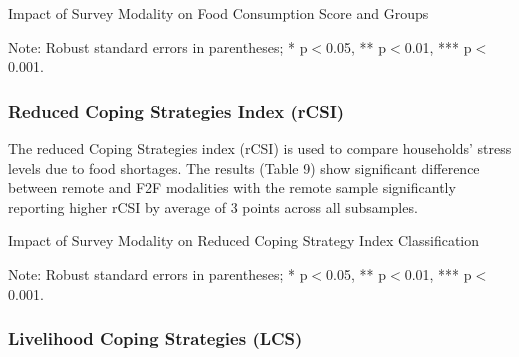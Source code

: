 \documentclass[11pt,harvard]{article}
\begin{document}
	\begin{table}[htbp]
		\centering
		\begin{adjustbox}{max width=\textwidth}
			\begin{threeparttable}
				\caption{Impact of Survey Modality on Food Consumption Score and Groups}
				\scriptsize
				 
				\label{tab:FCS_Modality_CAR}
				\begin{tablenotes}
					\item Note: Robust standard errors in parentheses; * p$<$0.05, ** p$<$0.01, *** p$<$0.001.
				\end{tablenotes}
			\end{threeparttable}
		\end{adjustbox}
	\end{table}
	
\pagebreak	
	
	
\subsubsection{Reduced Coping Strategies Index (rCSI)}

The reduced Coping Strategies index (rCSI) is used to compare households’ stress levels due to food shortages. The results (Table 9) show significant difference between remote and F2F modalities with the remote sample significantly reporting higher rCSI by average of 3 points across all subsamples.  
	
	
	\begin{table}[htbp]
		\centering
		\begin{adjustbox}{max width=\textwidth}
			\begin{threeparttable}
				\caption{Impact of Survey Modality on Reduced Coping Strategy Index Classification}
				\scriptsize
				 
				\label{tab:rCSI_Modality_CAR}
				\begin{tablenotes}
					\item Note: Robust standard errors in parentheses; * p$<$0.05, ** p$<$0.01, *** p$<$0.001.
				\end{tablenotes}
			\end{threeparttable}
		\end{adjustbox}
	\end{table}

	
\subsubsection{Livelihood Coping Strategies (LCS)}
\end{document}

